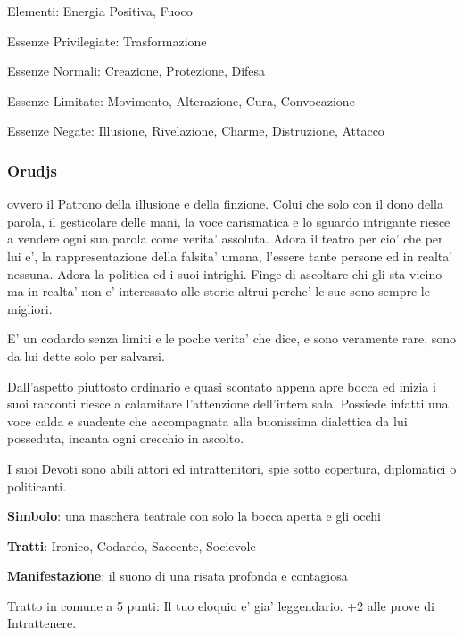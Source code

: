 \documentclass[a4paper,11pt,twoside,openany]{book}
\begin{document}
{		\bigskip
		
		Elementi: Energia Positiva, Fuoco
		
		\bigskip
		
		Essenze Privilegiate: Trasformazione
		
		Essenze Normali: Creazione, Protezione, Difesa
		
		Essenze Limitate: Movimento, Alterazione, Cura, Convocazione
		
		Essenze Negate: Illusione, Rivelazione, Charme, Distruzione, Attacco
		
		\subsubsection{Orudjs}
		
		\label{orudjs}
		
		ovvero il Patrono della illusione e della finzione. Colui che solo con il dono della parola, il gesticolare delle mani, la voce carismatica e lo sguardo intrigante riesce a vendere ogni sua parola come verita' assoluta. Adora il teatro per cio' che per lui e', la rappresentazione della falsita' umana, l'essere tante persone ed in realta' nessuna. Adora la politica ed i suoi intrighi. Finge di ascoltare chi gli sta vicino ma in realta' non e' interessato alle storie altrui perche' le sue sono sempre le migliori.
		
		E' un codardo senza limiti e le poche verita' che dice, e sono veramente rare, sono da lui dette solo per salvarsi.
		
		Dall'aspetto piuttosto ordinario e quasi scontato appena apre bocca ed inizia i suoi racconti riesce a calamitare l'attenzione dell'intera sala. Possiede infatti una voce calda e suadente che accompagnata alla buonissima dialettica da lui posseduta, incanta ogni orecchio in ascolto.
		
		I suoi Devoti sono abili attori ed intrattenitori, spie sotto copertura, diplomatici o politicanti.
		
		\textbf{Simbolo}: una maschera teatrale con solo la bocca aperta e
		gli occhi
		
		\textbf{Tratti}: Ironico, Codardo, Saccente, Socievole
		
		\textbf{Manifestazione}: il suono di una risata profonda e contagiosa
		
		\bigskip
		
		Tratto in comune a 5 punti: Il tuo eloquio e' gia' leggendario. +2 alle prove di Intrattenere.
		
}
\end{document}
